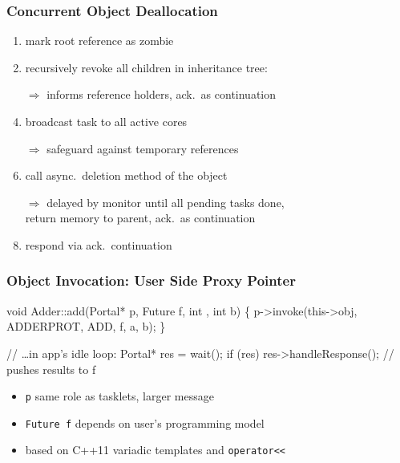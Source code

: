 \begin{frame}
  \frametitle{Concurrent Object Deallocation}

  \begin{enumerate}
  \item mark root reference as zombie
  \item recursively revoke all children in inheritance tree:
  \item[$\Rightarrow$] informs reference holders, ack.\ as continuation
  \item broadcast task to all active cores
  \item[$\Rightarrow$] safeguard against temporary references
  \item call async.\ deletion method of the object
  \item[$\Rightarrow$] delayed by monitor until all pending tasks done,\\
    return memory to parent, ack.\ as continuation
  \item respond via ack.\ continuation
  \end{enumerate}
\end{frame}

\begin{frame}[fragile]
  \frametitle{Object Invocation: User Side Proxy Pointer}

    \begin{semiverbatim}
void Adder::add(Portal* p, Future f, int , int b) \{
  p->invoke(this->obj, ADDERPROT, ADD, f, a, b); 
\}

// \ldots in app's idle loop:
Portal* res = wait();
if (res) res->handleResponse(); // pushes results to f
    \end{semiverbatim}  

  \begin{itemize}
  \item \texttt{p} same role as tasklets, larger message
  \item \texttt{Future f} depends on user's programming model
  \item based on C++11 variadic templates and \texttt{operator<<}
  \end{itemize}
\end{frame}

